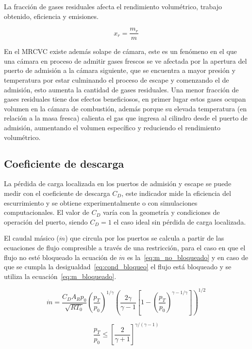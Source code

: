 La fracción de gases residuales afecta el rendimiento volumétrico, trabajo
obtenido, eficiencia y emisiones.

\begin{equation}
    x_{r} = \frac{m_{r}}{m}
\end{equation}

En el MRCVC existe además solape de cámara, este es un fenómeno en el que una
cámara en proceso de admitir gases frescos se ve afectada por la apertura del
puerto de admisión a la cámara siguiente, que se encuentra a mayor presión y
temperatura por estar culminando el proceso de escape y comenzando el de
admisión, esto aumenta la cantidad de gases residuales.
%
Una menor fracción de gases residuales tiene dos efectos beneficiosos, en
primer lugar estos gases ocupan volumen en la cámara de combustión, además
porque su elevada temperatura (en relación a la masa fresca) calienta el gas que
ingresa al cilindro desde el puerto de admisión, aumentando el volumen
específico y reduciendo el rendimiento volumétrico.



\subsection{Coeficiente de descarga}
%
La pérdida de carga localizada en los puertos de admisión y escape se puede
medir con el coeficiente de descarga $C_{D}$, este indicador mide la eficiencia
del escurrimiento y se obtiene experimentalmente o con simulaciones
computacionales.
%
El valor de $C_{D}$ varía con la geometría y condiciones de operación del
puerto, siendo $C_{D}=1$ el caso ideal sin pérdida de carga localizada.

El caudal másico ($\dot{m}$) que circula por los puertos se calcula a partir de
las ecuaciones de flujo compresible a través de una restricción, para el caso en
que el flujo no esté bloqueado la ecuación de $\dot{m}$ es
la~\ref{eq:m_no_bloqueado} y en caso de que se cumpla la
desigualdad~\ref{eq:cond_bloqueo} el flujo está bloqueado y se utiliza la
ecuación~\ref{eq:m_bloqueado}.
%

\begin{equation}\label{eq:m_no_bloqueado}
  \dot{m} = \frac{C_D A_R p_0}{\sqrt{R T_0}} {\left(\frac{p_T}{p_0} \right)}^{1/\gamma} {\left( \frac{2\gamma}{\gamma-1} \left[1- {(\frac{p_T}{p_0})}^{{\gamma-1}/\gamma} \right] \right)}^{1/2}
\end{equation}

\begin{equation}\label{eq:cond_bloqueo}
  \frac{p_T}{p_0} \le {[\frac{2}{\gamma+1}]}^{\gamma/(\gamma - 1)}
\end{equation}


